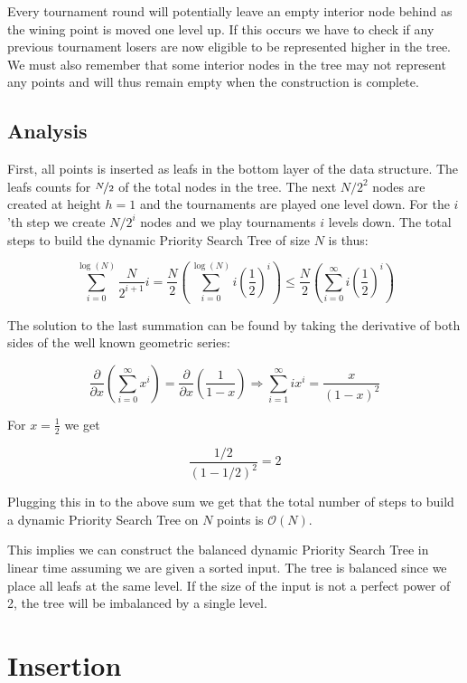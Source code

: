 \documentclass[twoside,11pt,openright]{report}
\begin{document}
Every tournament round will potentially leave an empty interior node behind as the wining point is moved one level up. If this occurs we have to check if any previous tournament losers are now eligible to be represented higher in the tree. We must also remember that some interior nodes in the tree may not represent any points and will thus remain empty when the construction is complete.

\subsection*{Analysis}
First, all points is inserted as leafs in the bottom layer of the data structure. The leafs counts for $\nicefrac{N}{2}$ of the total nodes in the tree. The next $N/2^2$ nodes are created at height $h = 1$ and the tournaments are played one level down. For the $i$'th step we create $N/2^i$ nodes and we play tournaments $i$ levels down. The total steps to build the dynamic Priority Search Tree of size $N$ is thus:

$$\sum\limits_{i=0}^{\log(N)} \frac{N}{2^{i+1}}i = \frac{N}{2} \left( \sum\limits_{i=0}^{\log(N)} i\left(\frac{1}{2}\right)^i \right) \leq \frac{N}{2} \left( \sum\limits_{i=0}^{\infty} i\left(\frac{1}{2}\right)^i \right)$$

The solution to the last summation can be found by taking the derivative of both sides of the well known geometric series:

$$ \frac{\partial}{\partial x} \left( \sum\limits_{i=0}^{\infty} x^i \right) = \frac{\partial}{\partial x} \left( \frac{1}{1-x} \right) \Rightarrow \sum_{i=1}^{\infty} ix^i = \frac{x}{(1-x)^2} $$

For $x = \frac{1}{2}$ we get

$$\frac{1/2}{(1-1/2)^2} = 2$$

Plugging this in to the above sum we get that the total number of steps to build a dynamic Priority Search Tree on $N$ points is $\mathcal{O}(N)$.

This implies we can construct the balanced dynamic Priority Search Tree in linear time assuming we are given a sorted input. The tree is balanced since we place all leafs at the same level. If the size of the input is not a perfect power of 2, the tree will be imbalanced by a single level.

\section{Insertion}
\end{document}
